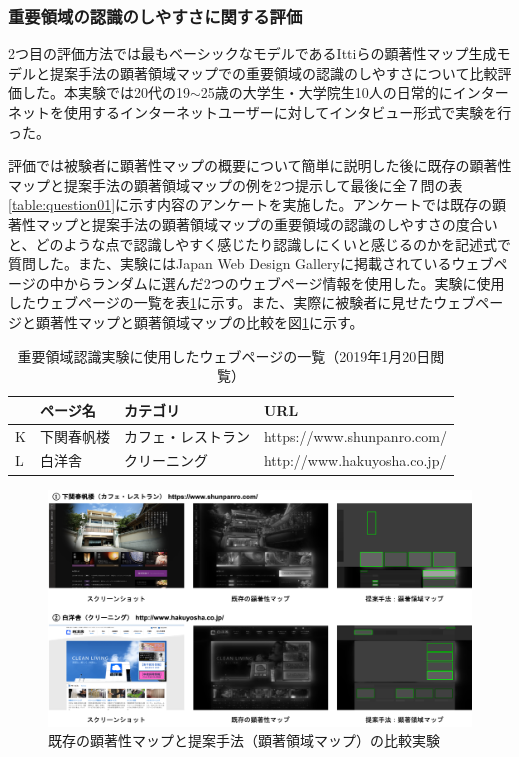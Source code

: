 \subsubsection{重要領域の認識のしやすさに関する評価}
\par 2つ目の評価方法では最もベーシックなモデルであるIttiらの顕著性マップ生成モデル\cite{itti1998model}と提案手法の顕著領域マップでの重要領域の認識のしやすさについて比較評価した。本実験では20代の19$\sim$25歳の大学生・大学院生10人の日常的にインターネットを使用するインターネットユーザーに対してインタビュー形式で実験を行った。

\par 評価では被験者に顕著性マップの概要について簡単に説明した後に既存の顕著性マップと提案手法の顕著領域マップの例を2つ提示して最後に全７問の表\ref{table:question01}に示す内容のアンケートを実施した。アンケートでは既存の顕著性マップと提案手法の顕著領域マップの重要領域の認識のしやすさの度合いと、どのような点で認識しやすく感じたり認識しにくいと感じるのかを記述式で質問した。また、実験にはJapan Web Design Gallery\cite{japanwebgallery}に掲載されているウェブページの中からランダムに選んだ2つのウェブページ情報を使用した。実験に使用したウェブページの一覧を表\ref{table:webpage-list2}に示す。また、実際に被験者に見せたウェブページと顕著性マップと顕著領域マップの比較を図\ref{fig_experience02}に示す。


\begin{table}[h]
  \caption{重要領域認識実験に使用したウェブページの一覧（2019年1月20日閲覧）}
  \label{table:webpage-list2}
  \centering
  \begingroup
  \renewcommand{\arraystretch}{1.2} %
  \small
    \begin{tabular}{llll}
    \hline
    & ページ名 & カテゴリ & URL \\
    \hline \hline
    K & 下関春帆楼 & カフェ・レストラン & https://www.shunpanro.com/ \\
    L & 白洋舎 & クリーニング & http://www.hakuyosha.co.jp/ \\
    \hline
  \end{tabular}
  \endgroup
\end{table}

\begin{figure}[H]
  \centering
  \includegraphics[width=12cm]{figures/07_experience02.png}
  \caption{既存の顕著性マップと提案手法（顕著領域マップ）の比較実験}
  \label{fig_experience02}
\end{figure}

